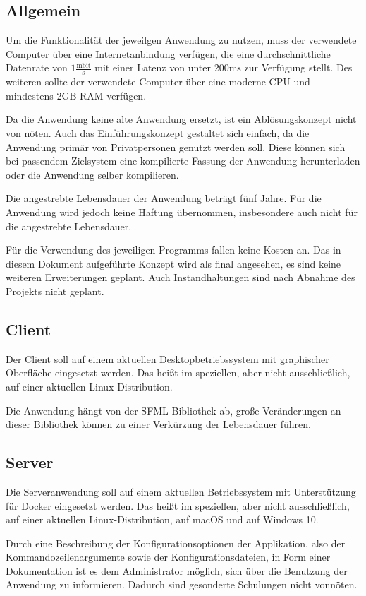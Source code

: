 \subsection{Allgemein}
Um die Funktionalität der jeweilgen Anwendung zu nutzen, muss der verwendete Computer über eine Internetanbindung verfügen, die eine durchschnittliche Datenrate von $1 \frac{\text{mbit}}{\text{s}}$ mit einer Latenz von unter $200\text{ms}$ zur Verfügung stellt. Des weiteren sollte der verwendete Computer über eine moderne CPU und mindestens $2\text{GB}$ RAM verfügen.

Da die Anwendung keine alte Anwendung ersetzt, ist ein Ablösungskonzept nicht von nöten. Auch das Einführungskonzept gestaltet sich einfach, da die Anwendung primär von Privatpersonen genutzt werden soll. Diese können sich bei passendem Zielsystem eine kompilierte Fassung der Anwendung herunterladen oder die Anwendung selber kompilieren.

Die angestrebte Lebensdauer der Anwendung beträgt fünf Jahre. Für die Anwendung wird jedoch keine Haftung übernommen, insbesondere auch nicht für die angestrebte Lebensdauer.

Für die Verwendung des jeweiligen Programms fallen keine Kosten an. Das in diesem Dokument aufgeführte Konzept wird als final angesehen, es sind keine weiteren Erweiterungen geplant. Auch Instandhaltungen sind nach Abnahme des Projekts nicht geplant.

\subsection{Client}
Der Client soll auf einem aktuellen Desktopbetriebssystem mit graphischer Oberfläche eingesetzt werden. Das heißt im speziellen, aber nicht ausschließlich, auf einer aktuellen Linux-Distribution.

Die Anwendung hängt von der SFML-Bibliothek ab, große Veränderungen an dieser Bibliothek können zu einer Verkürzung der Lebensdauer führen.

\subsection{Server}
Die Serveranwendung soll auf einem aktuellen Betriebssystem mit Unterstützung für Docker eingesetzt werden. Das heißt im speziellen, aber nicht ausschließlich, auf einer aktuellen Linux-Distribution, auf macOS und auf Windows 10.

Durch eine Beschreibung der Konfigurationsoptionen der Applikation, also der Kommandozeilenargumente sowie der Konfigurationsdateien, in Form einer Dokumentation ist es dem Administrator möglich, sich über die Benutzung der Anwendung zu informieren. Dadurch sind gesonderte Schulungen nicht vonnöten.

